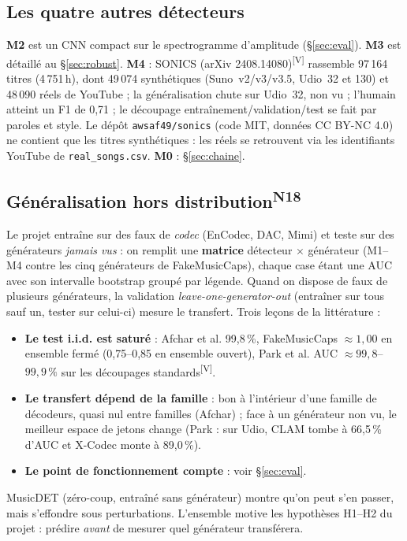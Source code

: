 \documentclass[10pt,a4paper]{article}
\newcommand{\sV}{\textsuperscript{\scriptsize\textcolor{green!40!black}{[V]}}}
\newcommand{\nref}[1]{\textsuperscript{\scriptsize\textcolor{black!55}{#1}}}
\begin{document}
\subsection{Les quatre autres détecteurs}
\textbf{M2} est un CNN compact sur le spectrogramme d'amplitude (§\ref{sec:eval}). \textbf{M3} est détaillé au §\ref{sec:robust}. \textbf{M4} : SONICS (arXiv 2408.14080)\sV{} rassemble 97\,164 titres (4\,751\,h), dont 49\,074 synthétiques (Suno~v2/v3/v3.5, Udio~32 et 130) et 48\,090 réels de YouTube ; la généralisation chute sur Udio~32, non vu ; l'humain atteint un F1 de 0,71 ; le découpage entraînement/validation/test se fait par paroles et style. Le dépôt \texttt{awsaf49/sonics} (code MIT, données CC BY-NC 4.0) ne contient que les titres synthétiques : les réels se retrouvent via les identifiants YouTube de \texttt{real\_songs.csv}. \textbf{M0} : §\ref{sec:chaine}.

\subsection{Généralisation hors distribution\nref{N18}}
Le projet entraîne sur des faux de \emph{codec} (EnCodec, DAC, Mimi) et teste sur des générateurs \emph{jamais vus} : on remplit une \textbf{matrice} détecteur $\times$ générateur (M1--M4 contre les cinq générateurs de FakeMusicCaps), chaque case étant une AUC avec son intervalle bootstrap groupé par légende. Quand on dispose de faux de plusieurs générateurs, la validation \emph{leave-one-generator-out} (entraîner sur tous sauf un, tester sur celui-ci) mesure le transfert. Trois leçons de la littérature :
\begin{itemize}
  \item \textbf{Le test i.i.d. est saturé} : Afchar et al. 99,8\,\%, FakeMusicCaps $\ensuremath{\approx}1{,}00$ en ensemble fermé (0,75--0,85 en ensemble ouvert), Park et al. AUC $\ensuremath{\approx}99{,}8$--$99{,}9\,\%$ sur les découpages standards\sV.
  \item \textbf{Le transfert dépend de la famille} : bon à l'intérieur d'une famille de décodeurs, quasi nul entre familles (Afchar) ; face à un générateur non vu, le meilleur espace de jetons change (Park : sur Udio, CLAM tombe à 66,5\,\% d'AUC et X-Codec monte à 89,0\,\%).
  \item \textbf{Le point de fonctionnement compte} : voir §\ref{sec:eval}.
\end{itemize}
MusicDET (zéro-coup, entraîné sans générateur) montre qu'on peut s'en passer, mais s'effondre sous perturbations. L'ensemble motive les hypothèses H1--H2 du projet : prédire \emph{avant} de mesurer quel générateur transférera.
\end{document}

